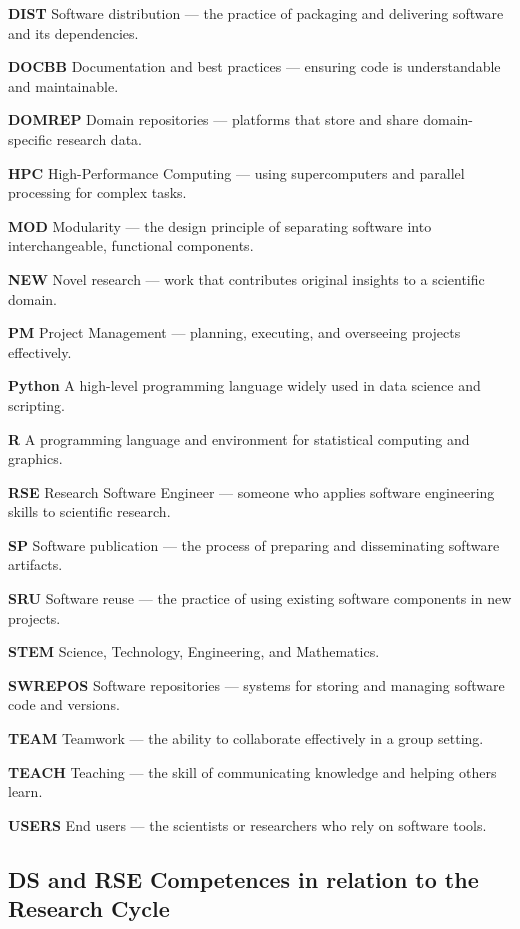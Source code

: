 \documentclass[
        english,biblatex
    ]{lni}
\begin{document}
    \textbf{DIST} Software distribution --- the practice of packaging
    and delivering software and its dependencies.

    \textbf{DOCBB} Documentation and best practices --- ensuring code is
    understandable and maintainable.

    \textbf{DOMREP} Domain repositories --- platforms that store and
    share domain-specific research data.

    \textbf{HPC} High-Performance Computing --- using supercomputers and
    parallel processing for complex tasks.

    \textbf{MOD} Modularity --- the design principle of separating
    software into interchangeable, functional components.

    \textbf{NEW} Novel research --- work that contributes original
    insights to a scientific domain.

    \textbf{PM} Project Management --- planning, executing, and
    overseeing projects effectively.

    \textbf{Python} A high-level programming language widely used in
    data science and scripting.

    \textbf{R} A programming language and environment for statistical
    computing and graphics.

    \textbf{RSE} Research Software Engineer --- someone who applies
    software engineering skills to scientific research.

    \textbf{SP} Software publication --- the process of preparing and
    disseminating software artifacts.

    \textbf{SRU} Software reuse --- the practice of using existing
    software components in new projects.

    \textbf{STEM} Science, Technology, Engineering, and Mathematics.

    \textbf{SWREPOS} Software repositories --- systems for storing and
    managing software code and versions.

    \textbf{TEAM} Teamwork --- the ability to collaborate effectively in
    a group setting.

    \textbf{TEACH} Teaching --- the skill of communicating knowledge and
    helping others learn.

    \textbf{USERS} End users --- the scientists or researchers who rely
    on software tools.

    \subsection{DS and RSE Competences in relation to the Research
    Cycle}\label{ds-and-rse-competences-in-relation-to-the-research-cycle}
\end{document}

